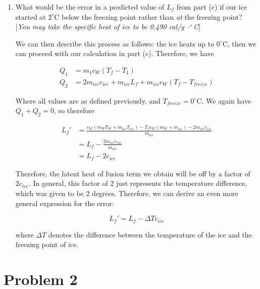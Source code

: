 \documentclass[10pt]{article}
\begin{document}
    \begin{enumerate}[resume, label=\alph*)]
        \item What would be the error in a predicted value of $L_f$ from part (c) if our ice started at $2^\circ$C below the freezing point rather than \textit{at} the freezing point? [\textit{You may take the specific heat of ice to be 0.490 cal/g $ \cdot ^\circ$C}] 
        
        \begin{solution}
            We can then describe this process as follows: the ice heats up to $0^\circ$C, then we can proceed with our calculation in part (c). Therefore, we have 

            \begin{align*}
                Q_1 &= m_1c_W(T_f - T_1)\\
                Q_2 &= 2m_{ice}c_{ice} + m_{ice}L_f + m_{ice}c_W(T_f - T_{freeze})
            \end{align*}

            Where all values are as defined previously, and $T_{freeze} = 0^\circ$C. We again have $Q_1 + Q_2 = 0$, so therefore 

            \begin{align*}
                L_f' &= \frac{c_W(m_WT_W + m_{ice}T_{ice}) - T_fc_W(m_W + m_{ice}) - 2m_{ice}c_{ice}}{m_{ice}}\\
                &= L_f - \frac{2m_{ice}c_{ice}}{m_{ice}}\\
                &= L_f - 2c_{ice}
            \end{align*}

            Therefore, the latent heat of fusion term we obtain will be off by a factor of $2c_{ice}$. In general, this factor of 2 just represents the temperature difference, which was given to be 2 degrees. Therefore, we can derive an even more general expression for the error: 

            \[ L_f' = L_f - \Delta Tc_{ice}\] 

            where $\Delta T$ denotes the difference between the temperature of the ice and the freezing point of ice.


        \end{solution}
    \end{enumerate}

    \pagebreak
    \section*{Problem 2}
\end{document}
